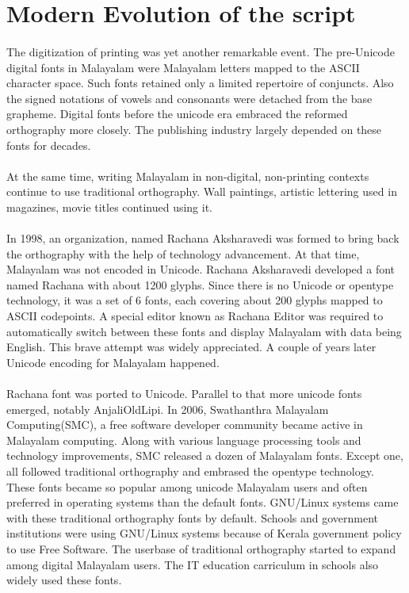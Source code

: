 \documentclass[10pt]{article}
\begin{document}
\section{Modern Evolution of the script}
\paragraph{}
The digitization of printing was yet another remarkable event. The pre-Unicode digital fonts in Malayalam were Malayalam letters mapped to the ASCII character space. Such fonts retained only a limited repertoire of conjuncts. Also the signed notations of vowels and consonants were detached from the base grapheme. Digital fonts before the unicode era embraced the reformed orthography more closely. The publishing industry largely depended on these fonts for decades.

\paragraph{}
At the same time, writing Malayalam in non-digital, non-printing contexts continue to use traditional orthography. Wall paintings, artistic lettering used in magazines, movie titles continued using it.

\paragraph{}
In 1998, an organization, named Rachana Aksharavedi was formed to bring back the orthography with the help of technology advancement. At that time, Malayalam was not encoded in Unicode. Rachana Aksharavedi developed a font named Rachana with about 1200 glyphs. Since there is no Unicode or opentype technology, it was a set of 6 fonts, each covering about 200 glyphs mapped to ASCII codepoints. A special editor known as Rachana Editor was required to automatically switch between these fonts and display Malayalam with data being English. This brave attempt was widely appreciated. A couple of years later Unicode encoding for Malayalam happened.

\paragraph{}
Rachana font was ported to Unicode. Parallel to that more unicode fonts emerged, notably AnjaliOldLipi. In 2006, Swathanthra Malayalam Computing(SMC), a free software developer community became active in Malayalam computing. Along with various language processing tools and technology improvements, SMC released a dozen of Malayalam fonts. Except one, all followed traditional orthography and embrased the opentype technology. These fonts became so popular among unicode Malayalam users and often preferred in operating systems than the default fonts. GNU/Linux systems came with these traditional orthography fonts by default. Schools and government institutions were using GNU/Linux systems because of Kerala government policy to use Free Software. The userbase of traditional orthography started to expand among digital Malayalam users. The IT education carriculum in schools also widely used these fonts.
\end{document}
